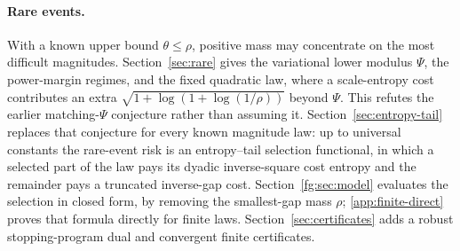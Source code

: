 \paragraph{Rare events.}
With a known upper bound $\theta\le\rho$, positive mass may concentrate
on the most difficult magnitudes. Section~\ref{sec:rare} gives the
variational lower modulus $\Psi$, the power-margin regimes, and the fixed
quadratic law, where a scale-entropy cost contributes an extra
$\sqrt{1+\log(1+\log(1/\rho))}$ beyond $\Psi$. This refutes the earlier
matching-$\Psi$ conjecture rather than assuming it.
Section~\ref{sec:entropy-tail} replaces that conjecture for every known
magnitude law: up to universal constants the rare-event risk is an
entropy--tail selection functional, in which a selected part of the law
pays its dyadic inverse-square cost entropy and the remainder pays a
truncated inverse-gap cost. Section~\ref{fg:sec:model} evaluates the
selection in closed form, by removing the smallest-gap mass $\rho$;
\cref{app:finite-direct} proves that formula directly for finite laws.
Section~\ref{sec:certificates}
adds a robust stopping-program dual and convergent finite certificates.

